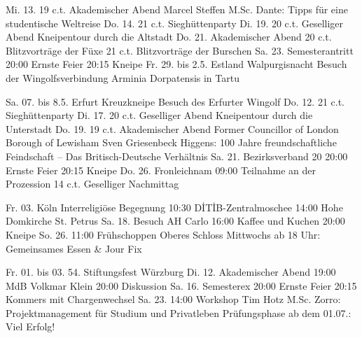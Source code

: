 %
% 

	
	\veranstaltungB
		{Mi. 13.} {19 c.t.} {}
		{Akademischer Abend} {Marcel Steffen M.Sc. \vulgo Dante: Tipps für eine studentische Weltreise}
	\veranstaltungA
		{Do. 14.} {21 c.t.} {}
		{Sieghüttenparty}
	\veranstaltungB
		{Di. 19.} {20 c.t.}{}
		{Geselliger Abend} {Kneipentour durch die Altstadt}
	\veranstaltungC
		{Do. 21.} {}
		{Akademischer Abend}
		{20 c.t.} {Blitzvorträge der Füxe}
		{21 c.t.} {Blitzvorträge der Burschen}
	\veranstaltungC
		{Sa. 23.} {}
		{Semesterantritt}
		{20:00}   {Ernste Feier}
		{20:15}   {Kneipe}
	\veranstaltungB
		{Fr. 29.} {bis 2.5.} {Estland}
		{Walpurgisnacht} {Besuch der Wingolfsverbindung Arminia Dorpatensis in Tartu}
		
	\veranstaltungB
		{Sa. 07.} {bis 8.5.} {Erfurt}
		{Kreuzkneipe} {Besuch des Erfurter Wingolf}
	\veranstaltungA
		{Do. 12.} {21 c.t.} {}
		{Sieghüttenparty}
	\veranstaltungB
		{Di. 17.} {20 c.t.} {}
		{Geselliger Abend} {Kneipentour durch die Unterstadt}
	\veranstaltungB
		{Do. 19.} {19 c.t.} {} 
		{Akademischer Abend}
		{Former Councillor of London Borough of Lewisham Sven Griesenbeck \vulgo Higgens: 100 Jahre freundschaftliche Feindschaft -- Das Britisch-Deutsche Verhältnis}
	\veranstaltungC
		{Sa. 21.} {} 
		{Bezirksverband 20}
		{20:00}	  {Ernste Feier}
		{20:15}   {Kneipe}
	\veranstaltungC
		{Do. 26.} {} 
		{Fronleichnam}
		{09:00}	  {Teilnahme an der Prozession}
		{14 c.t.} {Geselliger Nachmittag}
		
	\veranstaltungC
		{Fr. 03.} {Köln}
		{Interreligiöse Begegnung}
		{10:30}   {DİTİB-Zentralmoschee}
		{14:00}   {Hohe Domkirche St. Petrus}
	\veranstaltungC
		{Sa. 18.} {}
		{Besuch AH Carlo}
		{16:00}   {Kaffee und Kuchen}
		{20:00}   {Kneipe}
	\veranstaltungB
		{So. 26.} {11:00} {}
		{Frühschoppen} {Oberes Schloss}
	\neueAnkuendigung
		{Mittwochs ab 18 Uhr: Gemeinsames Essen \& Jour Fix}
		
	\veranstaltungB
		{Fr. 01.} {bis 03.} {}
		{54. Stiftungsfest} {Würzburg}
	\veranstaltungC
		{Di. 12.} {}
		{Akademischer Abend}
		{19:00}   {MdB Volkmar Klein}
		{20:00}   {Diskussion}
	\veranstaltungC
		{Sa. 16.} {}
		{Semesterex}
		{20:00}   {Ernste Feier}
		{20:15}   {Kommers mit Chargenwechsel}
	\veranstaltungB
		{Sa. 23.} {14:00} {}
		{Workshop} {Tim Hotz M.Sc. \vulgo Zorro: Projektmanagement für Studium und Privatleben}
	\neueAnkuendigung
		{Prüfungsphase ab dem 01.07.: Viel Erfolg!}